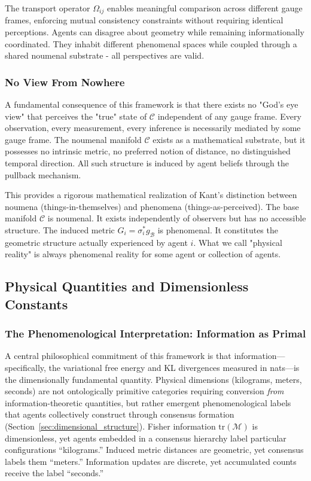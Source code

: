 \documentclass[11pt]{article}
\begin{document}
The transport operator $\Omega_{ij}$ enables meaningful comparison across different gauge frames, enforcing mutual consistency constraints without requiring identical perceptions. Agents can disagree about geometry while remaining informationally coordinated.  They inhabit different phenomenal spaces while coupled through a shared noumenal substrate - all perspectives are valid.

\subsubsection{No View From Nowhere}

A fundamental consequence of this framework is that there exists no "God's eye view" that perceives the "true" state of $\mathcal{C}$ independent of any gauge frame. Every observation, every measurement, every inference is necessarily mediated by some gauge frame. The noumenal manifold $\mathcal{C}$ exists as a mathematical substrate, but it possesses no intrinsic metric, no preferred notion of distance, no distinguished temporal direction. All such structure is induced by agent beliefs through the pullback mechanism.

This provides a rigorous mathematical realization of Kant's distinction between noumena (things-in-themselves) and phenomena (things-as-perceived). The base manifold $\mathcal{C}$ is noumenal. It exists independently of observers but has no accessible structure. The induced metric $G_i = \sigma_i^* g_{\mathcal{B}}$ is phenomenal.  It constitutes the geometric structure actually experienced by agent $i$. What we call "physical reality" is always phenomenal reality for some agent or collection of agents.

\subsection{Physical Quantities and Dimensionless Constants}

\subsubsection{The Phenomenological Interpretation: Information as Primal}
\label{sec:phenomenological_interpretation}

A central philosophical commitment of this framework is that information---specifically, the variational free energy and KL divergences measured in nats---is the dimensionally fundamental quantity. Physical dimensions (kilograms, meters, seconds) are not ontologically primitive categories requiring conversion \emph{from} information-theoretic quantities, but rather emergent phenomenological labels that agents collectively construct through consensus formation (Section~\ref{sec:dimensional_structure}). Fisher information $\mathrm{tr}(\mathcal{M})$ is dimensionless, yet agents embedded in a consensus hierarchy label particular configurations ``kilograms.'' Induced metric distances are geometric, yet consensus labels them ``meters.'' Information updates are discrete, yet accumulated counts receive the label ``seconds.''
\end{document}
